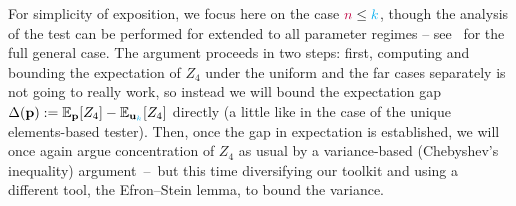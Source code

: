 For simplicity of exposition, we focus here on the case ${\textcolor{purple}{n}} \leq {\textcolor{cyan}{k}}$, though the analysis of the test can be performed for extended to all parameter regimes -- see~\citet{DiakonikolasGPP18} for the full general case. The argument proceeds in two steps: first, computing and bounding the expectation of $Z_4$ under the uniform and the far cases separately is not going to really work, so instead we will bound the expectation gap $\Delta(\p)\eqdef \bE{\p}{Z_4}-\bE{\uniform_{\ab}}{Z_4}$ directly (a little like in the case of the unique elements-based tester). Then, once the gap in expectation is established, we will once again argue concentration of $Z_4$ as usual by a variance-based (Chebyshev's inequality) argument~--~but this time diversifying our toolkit and using a different tool, the Efron--Stein lemma, to bound the variance.


